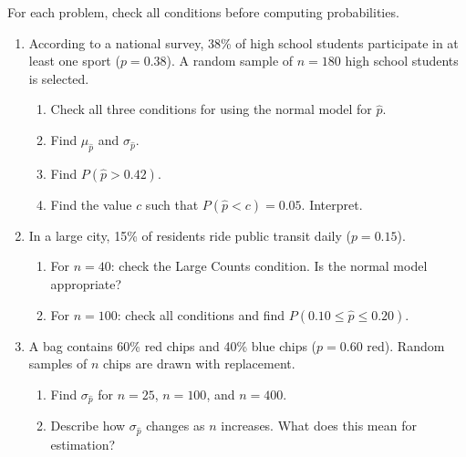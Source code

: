 \documentclass[10pt]{article}
\begin{document}
\namedateperiod

\vspace{0.15in}

For each problem, check all conditions before computing probabilities.

\begin{enumerate}

  \item According to a national survey, 38\% of high school students participate in at
        least one sport ($p = 0.38$). A random sample of $n = 180$ high school students
        is selected.
        \begin{enumerate}[label=\alph*.]
          \item Check all three conditions for using the normal model for $\hat{p}$.
          \item Find $\mu_{\hat{p}}$ and $\sigma_{\hat{p}}$.
                \vspace{0.5in}
          \item Find $P(\hat{p} > 0.42)$.
                \vspace{0.9in}
          \item Find the value $c$ such that $P(\hat{p} < c) = 0.05$. Interpret.
                \vspace{0.9in}
        \end{enumerate}

  \item In a large city, 15\% of residents ride public transit daily ($p = 0.15$).
        \begin{enumerate}[label=\alph*.]
          \item For $n = 40$: check the Large Counts condition. Is the normal model appropriate?
          \item For $n = 100$: check all conditions and find $P(0.10 \le \hat{p} \le 0.20)$.
                \vspace{1.0in}
        \end{enumerate}

  \item A bag contains 60\% red chips and 40\% blue chips ($p = 0.60$ red). Random samples
        of $n$ chips are drawn with replacement.
        \begin{enumerate}[label=\alph*.]
          \item Find $\sigma_{\hat{p}}$ for $n = 25$, $n = 100$, and $n = 400$.
                \vspace{0.7in}
          \item Describe how $\sigma_{\hat{p}}$ changes as $n$ increases. What does this
                mean for estimation?
        \end{enumerate}

\end{enumerate}
\end{document}
